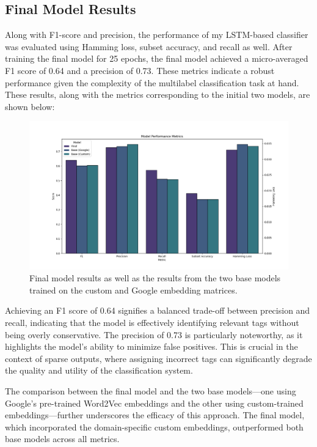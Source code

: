 \documentclass[12pt, letterpaper]{article}
\begin{document}
\subsection{Final Model Results}
Along with F1-score and precision, the performance of my LSTM-based classifier was evaluated using Hamming loss, subset accuracy, and recall as well. After training the final model for 25 epochs, the final model achieved a micro-averaged F1 score of 0.64 and a precision of 0.73. These metrics indicate a robust performance given the complexity of the multilabel classification task at hand. These results, along with the metrics corresponding to the initial two models, are shown below:
\begin{figure}[H]
\centering
\includegraphics[scale=0.45]{../figs/recurrent_nn/final_performance}
\caption{Final model results as well as the results from the two base models trained on the custom and Google embedding matrices.}
\end{figure}
Achieving an F1 score of 0.64 signifies a balanced trade-off between precision and recall, indicating that the model is effectively identifying relevant tags without being overly conservative. The precision of 0.73 is particularly noteworthy, as it highlights the model's ability to minimize false positives. This is crucial in the context of sparse outputs, where assigning incorrect tags can significantly degrade the quality and utility of the classification system.
\par The comparison between the final model and the two base models—one using Google's pre-trained Word2Vec embeddings and the other using custom-trained embeddings—further underscores the efficacy of this approach. The final model, which incorporated the domain-specific custom embeddings, outperformed both base models across all metrics.
\end{document}

